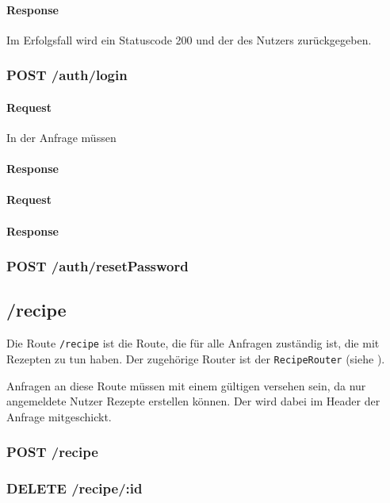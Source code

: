 \documentclass{entwurfsheft}
\begin{document}
\paragraph{Response}
Im Erfolgsfall wird ein Statuscode 200 und der  des Nutzers zurückgegeben.

\subsubsection*{POST /auth/login}
    \paragraph{Request}
        In der Anfrage müssen 
    \paragraph{Response}

\paragraph{Request}
\paragraph{Response}

\subsubsection*{POST /auth/resetPassword}

\subsection{/recipe}
Die Route \texttt{/recipe} ist die Route, die für alle Anfragen zuständig ist, die mit Rezepten zu tun haben.
Der zugehörige Router ist der \texttt{RecipeRouter} (siehe ).

Anfragen an diese Route müssen mit einem gültigen  versehen sein, da nur angemeldete Nutzer Rezepte erstellen können.
Der  wird dabei im Header der Anfrage mitgeschickt.

\subsubsection*{POST /recipe}
\subsubsection*{DELETE /recipe/:id}
\end{document}
